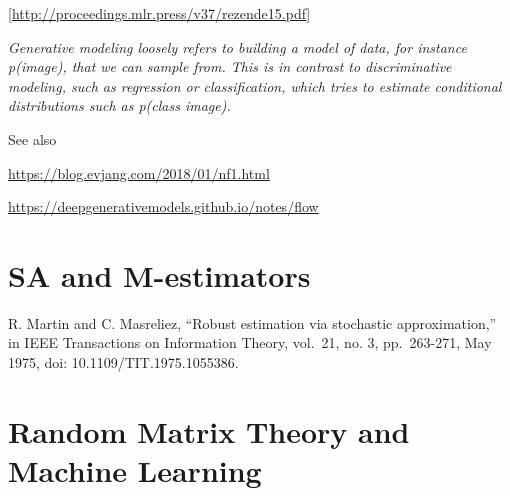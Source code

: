 \documentclass[
  11pt,
]{book}
\begin{document}
{[}\url{http://proceedings.mlr.press/v37/rezende15.pdf}{]}

\emph{Generative modeling loosely refers to building a model of data, for instance p(image), that we can sample from. This is in contrast to discriminative modeling, such as regression or classification, which tries to estimate conditional distributions such as p(class \textbar{} image).}

See also

\url{https://blog.evjang.com/2018/01/nf1.html}

\url{https://deepgenerativemodels.github.io/notes/flow}

\hypertarget{sa-and-m-estimators}{%
\chapter{SA and M-estimators}\label{sa-and-m-estimators}}

R. Martin and C. Masreliez, ``Robust estimation via stochastic approximation,'' in IEEE Transactions on Information Theory, vol.~21, no. 3, pp.~263-271, May 1975, doi: 10.1109/TIT.1975.1055386.

\hypertarget{random-matrix-theory-and-machine-learning}{%
\chapter{Random Matrix Theory and Machine Learning}\label{random-matrix-theory-and-machine-learning}}

  
\end{document}

